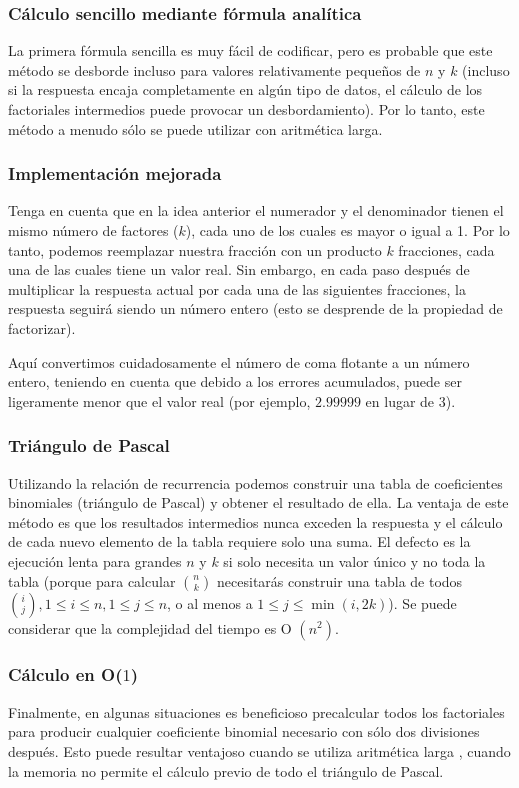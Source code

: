 \subsubsection{Cálculo sencillo mediante fórmula analítica}
La primera fórmula sencilla es muy fácil de codificar, pero es probable que este método se desborde incluso para valores relativamente pequeños de $n$ y $k$ (incluso si la respuesta encaja completamente en algún tipo de datos, el cálculo de los factoriales intermedios puede provocar un desbordamiento). Por lo tanto, este método a menudo sólo se puede utilizar con aritmética larga.

\subsubsection{Implementación mejorada}

Tenga en cuenta que en la idea anterior el numerador y el denominador tienen el mismo número de factores ($k$), cada uno de los cuales es mayor o igual a 1. Por lo tanto, podemos reemplazar nuestra fracción con un producto $k$ fracciones, cada una de las cuales tiene un valor real. Sin embargo, en cada paso después de multiplicar la respuesta actual por cada una de las siguientes fracciones, la respuesta seguirá siendo un número entero (esto se desprende de la propiedad de factorizar).

Aquí convertimos cuidadosamente el número de coma flotante a un número entero, teniendo en cuenta que debido a los errores acumulados, puede ser ligeramente menor que el valor real (por ejemplo, $2.99999$ en lugar de $3$).

\subsubsection{Triángulo de Pascal}

Utilizando la relación de recurrencia podemos construir una tabla de  coeficientes binomiales (triángulo de Pascal) y obtener el resultado de  ella. La ventaja de este método es que los 
resultados intermedios nunca exceden la respuesta y el cálculo de cada nuevo elemento de la tabla requiere solo una suma. El defecto es la ejecución lenta para grandes $n$ y $k$ si solo necesita 
un valor único y no toda la tabla (porque para calcular $\binom n k$ necesitarás construir una tabla de todos $\binom i j, 1 \le i \le n, 1 \le j \le n$, o al menos a $1 \le j \le \min (i,2k)$). Se puede considerar que la complejidad del tiempo es O $(n^2)$.

\subsubsection{Cálculo en O($1$) }

Finalmente, en algunas situaciones es beneficioso precalcular todos los factoriales para producir cualquier coeficiente binomial necesario con sólo dos divisiones después. Esto puede resultar ventajoso cuando se utiliza aritmética larga , cuando la memoria no permite el cálculo previo de todo el triángulo de Pascal.